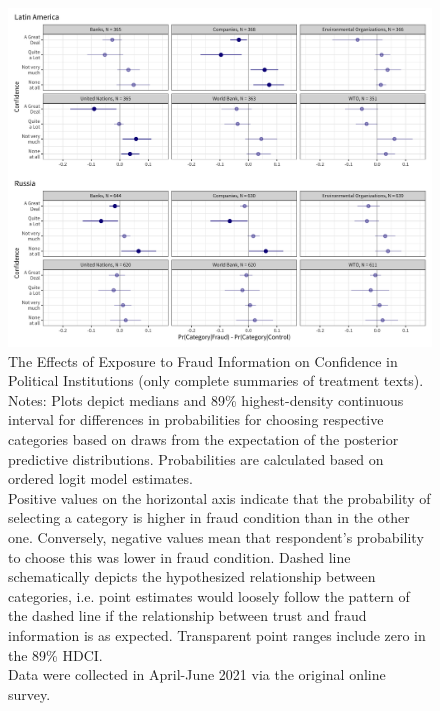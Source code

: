 \documentclass[11pt, ngerman,english,a4]{article}
\begin{document}
\begin{figure}[H]
	\centering
	\includegraphics[width=\linewidth,trim=4 4 4 4,clip]{figs/main_hdi89_7.png}
	\caption{The Effects of Exposure to Fraud Information on Confidence in Political Institutions (only complete summaries of treatment texts).  \\
		\footnotesize{Notes: Plots depict medians and 89\% highest-density continuous interval for differences in probabilities for choosing respective categories based on draws from the expectation of the posterior predictive distributions. Probabilities are calculated based on ordered logit model estimates.\\
			Positive values on the horizontal axis indicate that the probability of selecting a category is higher in fraud condition than in the other one. Conversely, negative values mean that respondent's probability to choose this was lower in fraud condition. Dashed line schematically depicts the hypothesized relationship between categories, i.e. point estimates would loosely follow the pattern of the dashed line if the relationship between trust and fraud information is as expected. Transparent point ranges include zero in the 89\% HDCI.\\
	Data were collected in April-June 2021 via the original online survey. } }
	\singlespacing
	\raggedright
	    
	\label{fig:main-7}
\end{figure}

% 
% 
\end{document}

